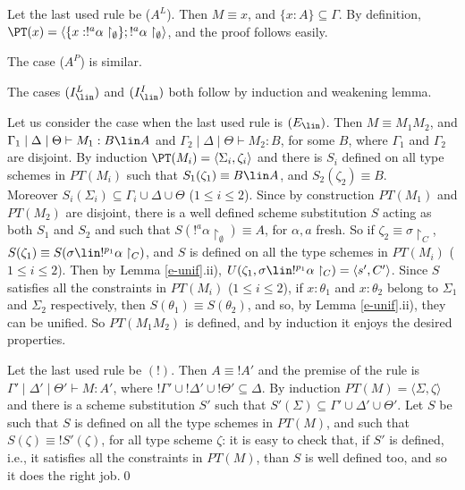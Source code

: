 \begin{enumerate}[i)]
Let the last used rule be ($A^{L}$). Then $M \equiv x$, and $\{x:A\} \subseteq\Gamma $. By definition, 
$ \PT(x)=\langle\{x:!^a \alpha\restriction_{\emptyset}\};!^a \alpha\restriction_{\emptyset}
\rangle$, and the proof follows easily.

The case ($A^{P}$) is similar.

The cases $(I^{L}_{\lin})$ and $(I^{I}_{\lin})$ both follow by induction and weakening lemma.

Let us consider the case when the last used rule is $(E_{\lin})$. 
Then $M \equiv M_{1}M_{2}$, and 
$\Gamma_{1}\mid \Delta \mid \Theta \vdash M_{1}:B \lin A $ and 
$\Gamma_{2}\mid \Delta \mid \Theta \vdash M_{2}:B $, for some $B$,
where $\Gamma_{1}$ and $\Gamma_{2}$ are disjoint.
By induction $\PT(M_i) = \langle \Sigma_i, \zeta_{i}\rangle$ and 
there is $S_{i}$ defined on all type schemes in $PT(M_i)$ such that $S_{1}(\zeta_{1})\equiv B\lin A$,
and $S_{2}(\zeta_{2})\equiv B $.\\
Moreover 
$S_{i}(\Sigma_{i})\subseteq \Gamma_{i}\cup \Delta \cup \Theta$ ($1 \leq i \leq 2$). 
Since by construction $PT(M_{1})$ and $PT(M_{2})$ are disjoint, there is a well defined scheme substitution
$S$ acting as both $S_{1}$ and $S_{2}$ and such that 
$S(!^a\alpha\restriction_{\emptyset})\equiv A$, for $\alpha, a$ fresh. So
if $\zeta_{2}\equiv \sigma\restriction_{C}$,
$S(\zeta_{1})\equiv S(\sigma\lin !^{p_{1}}\alpha\restriction_{C})$, 
and $S$ is defined on all the type schemes in
$PT(M_i)$ ($1\leq i \leq 2$).
Then 
by Lemma \ref{e-unif}.ii), 
$U(\zeta_{1},\sigma\lin !^{p_{1}}\alpha\restriction_{C})=\langle s',C' \rangle$.
Since $S$ satisfies all the constraints in $PT(M_{i})$ ($1\leq i \leq 2$), if 
$x:\theta_{1}$ and $x:\theta_{2}$ belong to $\Sigma_{1}$ and $\Sigma_{2}$
respectively, then $S(\theta_{1})\equiv S(\theta_{2})$, and so, by Lemma \ref{e-unif}.ii), 
they can be unified.
So $PT(M_{1}M_{2})$ is defined, and by 
induction it enjoys the desired properties.

Let the last used rule be $(!)$. Then $A \equiv !A'$ and the premise of the rule is 
$\Gamma' \mid \Delta' \mid \Theta' \vdash M:A'$, where 
$!\Gamma' \cup !\Delta' \cup ! \Theta' \subseteq \Delta $.
By induction $PT(M)=\langle \Sigma, \zeta \rangle$ and there is a scheme substitution $S'$
such that $S'(\Sigma)\subseteq \Gamma' \cup \Delta' \cup \Theta' $.
Let $S$ be such that $S$ is defined on all the type schemes in $PT(M)$, and
such that $S(\zeta)\equiv !S'(\zeta)$, for all 
type scheme $\zeta$: it is easy to check that, if $S'$ is defined, i.e., it satisfies all the constraints in $PT(M)$, than $S$ is 
well defined too, and so it does the right job.\qed
\end{enumerate}



